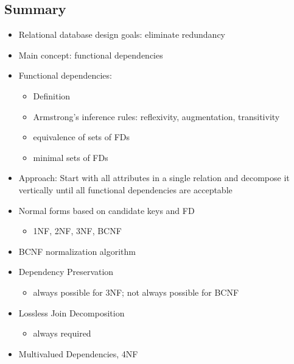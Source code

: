 \subsection{Summary}
\begin{itemize}[label=\(\rhd\)]
    \item Relational database design goals: eliminate redundancy
    \item Main concept: functional dependencies
    \item Functional dependencies:
    \begin{itemize}[label=\(\rhd\)]
        \item Definition
        \item Armstrong's inference rules: reflexivity, augmentation, transitivity
        \item equivalence of sets of FDs
        \item minimal sets of FDs
    \end{itemize}
    \item Approach: Start with all attributes in a single relation and decompose it vertically until all functional dependencies are acceptable
    \item Normal forms based on candidate keys and FD
    \begin{itemize}[label=\(\rhd\)]
        \item 1NF, 2NF, 3NF, BCNF
    \end{itemize}
    \item BCNF normalization algorithm 
    \item Dependency Preservation
    \begin{itemize}[label=\(\rhd\)]
        \item always possible for 3NF; not always possible for BCNF
    \end{itemize}
    \item Lossless Join Decomposition
    \begin{itemize}[label=\(\rhd\)]
        \item always required
    \end{itemize}
    \item Multivalued Dependencies, 4NF
\end{itemize}